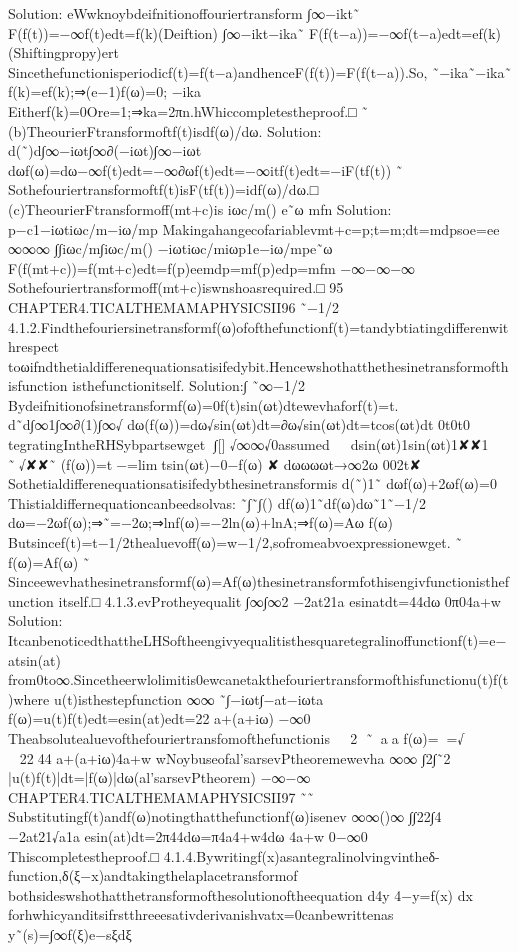 {Solution:
eWwknoybdeifnitionoffouriertransform
∫∞−ikt˜
F(f(t))=−∞f(t)edt=f(k)(Deiftion)
∫∞−ikt−ika˜
F(f(t−a))=−∞f(t−a)edt=ef(k)(Shiftingpropy)ert
Sincethefunctionisperiodicf(t)=f(t−a)andhenceF(f(t))=F(f(t−a)).So,
˜−ika˜−ika˜
f(k)=ef(k);⇒(e−1)f(ω)=0;
−ika
Eitherf(k)=0Ore=1;⇒ka=2πn.hWhiccompletestheproof.□
˜
(b)TheourierFtransformoftf(t)isdf(ω)/dω.
Solution:
d(˜)d∫∞−iωt∫∞∂(−iωt)∫∞−iωt
dωf(ω)=dω−∞f(t)edt=−∞∂ωf(t)edt=−∞itf(t)edt=−iF(tf(t))
˜
Sothefouriertransformoftf(t)isF(tf(t))=idf(ω)/dω.□
(c)TheourierFtransformoff(mt+c)is
iωc/m()
e˜ω
mfn
Solution:
p−c1−iωtiωc/m−iω/mp
Makingahangecofariablevmt+c=p;t=m;dt=mdpsoe=ee
∞∞∞
∫∫iωc/m∫iωc/m()
−iωtiωc/miωp1e−iω/mpe˜ω
F(f(mt+c))=f(mt+c)edt=f(p)eemdp=mf(p)edp=mfm
−∞−∞−∞
Sothefouriertransformoff(mt+c)iswnshoasrequired.□
95
CHAPTER4.TICALTHEMAMAPHYSICSII96
˜−1/2
4.1.2.Findthefouriersinetransformf(ω)ofofthefunctionf(t)=tandybtiatingdifferenwithrespect
toωifndthetialdifferenequationsatisifedybit.Hencewshothatthethesinetransformofthisfunction
isthefunctionitself.
Solution:∫
˜∞−1/2
Bydeifnitionofsinetransformf(ω)=0f(t)sin(ωt)dtewevhaforf(t)=t.
d˜d∫∞1∫∞∂(1)∫∞√
dω(f(ω))=dω√sin(ωt)dt=∂ω√sin(ωt)dt=tcos(ωt)dt
0t0t0
tegratingIntheRHSybpartsewget
∫[]
√∞∞√0assumed
✘✿
dsin(ωt)1sin(ωt)1✘✘1
˜√✘✘˜
(f(ω))=t−=lim✘tsin(ωt)−0−f(ω)
✘
dωωωωt→∞2ω
002t✘
Sothetialdifferenequationsatisifedybthesinetransformis
d(˜)1˜
dωf(ω)+2ωf(ω)=0
Thistialdiffernequationcanbeedsolvas:
˜∫˜∫()
df(ω)1˜df(ω)dω˜1˜−1/2
dω=−2ωf(ω);⇒˜=−2ω;⇒lnf(ω)=−2ln(ω)+lnA;⇒f(ω)=Aω
f(ω)
Butsincef(t)=t−1/2thealuevoff(ω)=w−1/2,sofromeabvoexpressionewget.
˜
f(ω)=Af(ω)
˜
Sinceewevhathesinetransformf(ω)=Af(ω)thesinetransformfothisengivfunctionisthefunction
itself.□
4.1.3.evProtheyequalit
∫∞∫∞2
−2at21a
esinatdt=44dω
0π04a+w
Solution:
ItcanbenoticedthattheLHSoftheengivyequalitisthesquaretegralinoffunctionf(t)=e−atsin(at)
from0to∞.Sincetheerwlolimitis0ewcanetakthefouriertransformofthisfunctionu(t)f(t)where
u(t)isthestepfunction
∞∞
˜∫−iωt∫−at−iωta
f(ω)=u(t)f(t)edt=esin(at)edt=22
a+(a+iω)
−∞0
Theabsolutealuevofthefouriertransfomofthefunctionis
2
˜aa
f(ω)==√
2244
a+(a+iω)4a+w
wNoybuseofal’sarsevPtheoremewevha
∞∞
∫2∫˜2
|u(t)f(t)|dt=|f(ω)|dω(al’sarsevPtheorem)
−∞−∞
CHAPTER4.TICALTHEMAMAPHYSICSII97
˜˜
Substitutingf(t)andf(ω)notingthatthefunctionf(ω)isenev
∞∞()∞
∫∫22∫4
−2at21√a1a
esin(at)dt=2π44dω=π4a4+w4dω
4a+w
0−∞0
Thiscompletestheproof.□
4.1.4.Bywritingf(x)asantegralinolvingvintheδ-function,δ(ξ−x)andtakingthelaplacetransformof
bothsideswshothatthetransformofthesolutionoftheequation
d4y
4−y=f(x)
dx
forhwhicyanditsifrstthreeesativderivanishvatx=0canbewrittenas
y˜(s)=∫∞f(ξ)e−sξdξ
}
